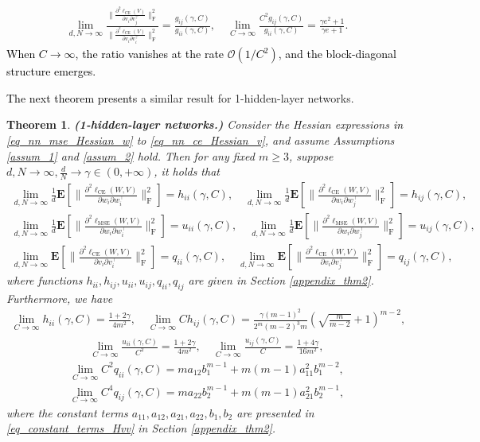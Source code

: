 \documentclass{article}
\newcommand{\E}{\mathbf{E}}
\newcommand{\rw}{\rightarrow}
\newcommand{\1}{^{(1)}}
\newcommand{\2}{^{(2)}}
\renewcommand{\l}{\left}
\renewcommand{\r}{\right}
\newtheorem{thm}{Theorem}
\newcommand{\bea}{\begin{equation}\begin{aligned}}
\newcommand{\eea}{\end{aligned}\end{equation}}
\newcommand{\zhaoruirevise}[1]{\textcolor{black}{ #1}}
\begin{document}
        \bea\label{eq_thm_linear_model_ratio}
        \lim_{d,N\rw\infty} \frac{\bigg\|\frac{\partial^2\ell_{\text{CE}}(V)}{\partial v_i  \partial v_j^\top}\bigg\|_{\operatorname{F}}^2} {\bigg\|\frac{\partial^2\ell_{\text{CE}}(V)}{\partial v_i  \partial v_i^\top}\bigg\|_{\operatorname{F}}^2}  =  \frac{g_{ij}(\gamma,C)}{g_{ii}(\gamma,C)}, \quad 
        \lim_{C\rw\infty}\frac{C^2g_{ij}(\gamma,C)}{g_{ii}(\gamma,C)}=\frac{\gamma e^2+1}{\gamma e+1}.
        \eea
\zhaoruirevise{When $C\rw\infty$, the ratio vanishes at the rate $\mathcal{O}(1/C^2)$, and the block-diagonal structure emerges.}

\zhaoruirevise{The next theorem presents} a similar result for 1-hidden-layer networks.

\begin{thm}
\label{thm_nn}
        {\bf (1-hidden-layer networks.)} Consider the Hessian expressions \zhaoruirevise{in} \eqref{eq_nn_mse_Hessian_w} to \eqref{eq_nn_ce_Hessian_v}, and assume Assumptions \ref{assum_1} and \ref{assum_2} hold. Then for any fixed $m\geq 3$, suppose $d,N\rw\infty, \frac
    {d}{N}\rw \gamma\in (0,+\infty)$, it holds that
{\small   \bea\label{thm2_NN_CE_Hww}
\lim_{d,N\rw \infty}\frac{1}{d}\E\l[\bigg\|\frac{\partial^2\ell_{\text{CE}}(W,V)}{\partial w_i  \partial w_i^\top}\bigg\|_{\operatorname{F}}^2\r]=h_{ii}(\gamma,C),\quad
\lim_{d,N\rw \infty}\frac{1}{d}\E\l[\bigg\|\frac{\partial^2\ell_{\text{CE}}(W,V)}{\partial w_i  \partial w_j^\top}\bigg\|_{\operatorname{F}}^2\r]=h_{ij}(\gamma,C),
\eea
\bea\label{thm2_NN_MSE_Hww}
\lim_{d,N\rw\infty}\frac{1}{d}\E\l[\bigg\|\frac{\partial^2\ell_{\text{MSE}}(W,V)}{\partial w_i  \partial w_i^\top}\bigg\|_{\operatorname{F}}^2\r]=u_{ii}(\gamma,C),\quad
\lim_{d,N\rw\infty}\frac{1}{d}\E\l[\bigg\|\frac{\partial^2\ell_{\text{MSE}}(W,V)}{\partial w_i  \partial w_j^\top}\bigg\|_{\operatorname{F}}^2\r]=u_{ij}(\gamma,C),
\eea }
\bea\label{NN_CV_Hvv}
\lim_{d,N\rw\infty}\E\l[\bigg\|\frac{\partial^2\ell_{\text{CE}}(W,V)}{\partial v_i  \partial v_i^\top}\bigg\|_{\operatorname{F}}^2\r]=q_{ii}(\gamma,C),\quad
\lim_{d,N\rw\infty}\E\l[\bigg\|\frac{\partial^2\ell_{\text{CE}}(W,V)}{\partial v_i  \partial v_j^\top}\bigg\|_{\operatorname{F}}^2\r]=q_{ij}(\gamma,C),
\eea
where functions $h_{ii},h_{ij},u_{ii},u_{ij},q_{ii},q_{ij}$ are given in Section \ref{appendix_thm2}. Furthermore, we have 
\bea
\lim_{C\rw\infty} h_{ii}(\gamma,C)=\frac{1+2\gamma}{4m^2},\quad
\lim_{C\rw\infty} Ch_{ij}(\gamma,C)=\frac{\gamma(m-1)^2}{2^m(m-2)^3m}\l(\sqrt{\frac{m}{m-2}}+1\r)^{m-2},
\eea
\bea
\lim_{C\rw\infty}\frac{u_{ii}(\gamma,C)}{C^2}=\frac{1+2\gamma}{4m^2},\quad
\lim_{C\rw\infty}\frac{u_{ij}(\gamma,C)}{C}=\frac{1+4\gamma}{16m^2},
\eea
\bea
\lim_{C\rw\infty} C^2 q_{ii}(\gamma,C)=ma_{12}b_1^{m-1}+m(m-1)a_{11}^2b_1^{m-2},
\eea
\bea
\lim_{C\rw\infty} C^4 q_{ij}(\gamma,C)=ma_{22}b_2^{m-1}+m(m-1)a_{21}^2b_2^{m-1},
\eea
where the constant terms $a_{11}, a_{12}, a_{21}, a_{22}, b_1, b_2$ are presented in \eqref{eq_constant_terms_Hvv} in Section \ref{appendix_thm2}.

\end{thm}
\end{document}
